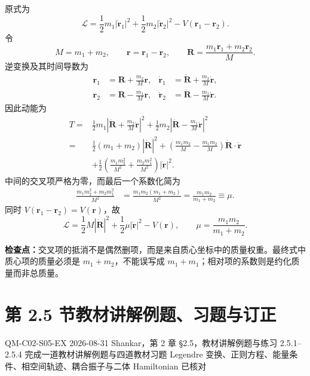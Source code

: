 \begin{checkedsolution}
原式为
\begin{equation}
  \mathcal L
  =\frac12m_1|\dot{\bm r}_1|^2
  +\frac12m_2|\dot{\bm r}_2|^2
  -V(\bm r_1-\bm r_2).
  \label{eq:QM-C02-S03-E01-original}
\end{equation}
令
\[
  M=m_1+m_2,
  \qquad
  \bm r=\bm r_1-\bm r_2,
  \qquad
  \bm R=\frac{m_1\bm r_1+m_2\bm r_2}{M}.
\]
逆变换及其时间导数为
\begin{align*}
  \bm r_1&=\bm R+\frac{m_2}{M}\bm r,
  &\dot{\bm r}_1&=\dot{\bm R}+\frac{m_2}{M}\dot{\bm r},\\
  \bm r_2&=\bm R-\frac{m_1}{M}\bm r,
  &\dot{\bm r}_2&=\dot{\bm R}-\frac{m_1}{M}\dot{\bm r}.
\end{align*}
因此动能为
\begin{align*}
  T={}&\frac12m_1
  \left|
    \dot{\bm R}+\frac{m_2}{M}\dot{\bm r}
  \right|^2
  +\frac12m_2
  \left|
    \dot{\bm R}-\frac{m_1}{M}\dot{\bm r}
  \right|^2\\
  ={}&\frac12(m_1+m_2)|\dot{\bm R}|^2
  +\left(
    \frac{m_1m_2}{M}-\frac{m_1m_2}{M}
  \right)\dot{\bm R}\cdot\dot{\bm r}\\
  &+\frac12\left(
    \frac{m_1m_2^2}{M^2}
    +\frac{m_2m_1^2}{M^2}
  \right)|\dot{\bm r}|^2.
\end{align*}
中间的交叉项严格为零，而最后一个系数化简为
\begin{align*}
  \frac{m_1m_2^2+m_2m_1^2}{M^2}
  &=\frac{m_1m_2(m_1+m_2)}{M^2}
   =\frac{m_1m_2}{m_1+m_2}
   \equiv\mu.
\end{align*}
同时 $V(\bm r_1-\bm r_2)=V(\bm r)$，故
\begin{equation}
  \boxed{
  \mathcal L
  =\frac12M|\dot{\bm R}|^2
  +\frac12\mu|\dot{\bm r}|^2
  -V(\bm r),
  \qquad
  \mu=\frac{m_1m_2}{m_1+m_2}.}
  \label{eq:QM-C02-S03-E01-separated}
\end{equation}
\end{checkedsolution}

\textbf{检查点：}交叉项的抵消不是偶然删项，而是来自质心坐标中的质量权重。最终式中质心项的质量必须是 $m_1+m_2$，不能误写成 $m_1+m_1$；相对项的系数则是约化质量而非总质量。

\section{第 2.5 节教材讲解例题、习题与订正}
\label{exercise-set:QM-C02-S05}

\exercisemeta
  {QM-C02-S05-EX}
  {2026-08-31}
  {Shankar，第 2 章 \S 2.5，教材讲解例题与练习 2.5.1--2.5.4}
  {完成一道教材讲解例题与四道教材习题}
  {Legendre 变换、正则方程、能量条件、相空间轨迹、耦合振子与二体 Hamiltonian 已核对}

